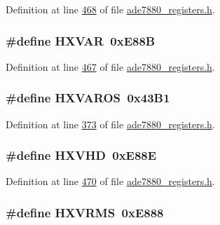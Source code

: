 Definition at line \hyperlink{a00036_source_l00468}{468} of file \hyperlink{a00036_source}{ade7880\-\_\-registers.\-h}.

\hypertarget{a00036_ab41bd850709b7c4ffd94d5933e850df7}{
\subsubsection[{H\-X\-V\-A\-R}]{\setlength{\rightskip}{0pt plus 5cm}\#define H\-X\-V\-A\-R~0x\-E88\-B}}\label{de/d8c/a00036_ab41bd850709b7c4ffd94d5933e850df7}


Definition at line \hyperlink{a00036_source_l00467}{467} of file \hyperlink{a00036_source}{ade7880\-\_\-registers.\-h}.

\hypertarget{a00036_a9ab1152e35c6f57bd448b69dd504871c}{
\subsubsection[{H\-X\-V\-A\-R\-O\-S}]{\setlength{\rightskip}{0pt plus 5cm}\#define H\-X\-V\-A\-R\-O\-S~0x43\-B1}}\label{de/d8c/a00036_a9ab1152e35c6f57bd448b69dd504871c}


Definition at line \hyperlink{a00036_source_l00373}{373} of file \hyperlink{a00036_source}{ade7880\-\_\-registers.\-h}.

\hypertarget{a00036_a7019352fa8966727d6306b8a2bf81829}{
\subsubsection[{H\-X\-V\-H\-D}]{\setlength{\rightskip}{0pt plus 5cm}\#define H\-X\-V\-H\-D~0x\-E88\-E}}\label{de/d8c/a00036_a7019352fa8966727d6306b8a2bf81829}


Definition at line \hyperlink{a00036_source_l00470}{470} of file \hyperlink{a00036_source}{ade7880\-\_\-registers.\-h}.

\hypertarget{a00036_a0fc103a0748d8aa916c859108574913a}{
\subsubsection[{H\-X\-V\-R\-M\-S}]{\setlength{\rightskip}{0pt plus 5cm}\#define H\-X\-V\-R\-M\-S~0x\-E888}}\label{de/d8c/a00036_a0fc103a0748d8aa916c859108574913a}


